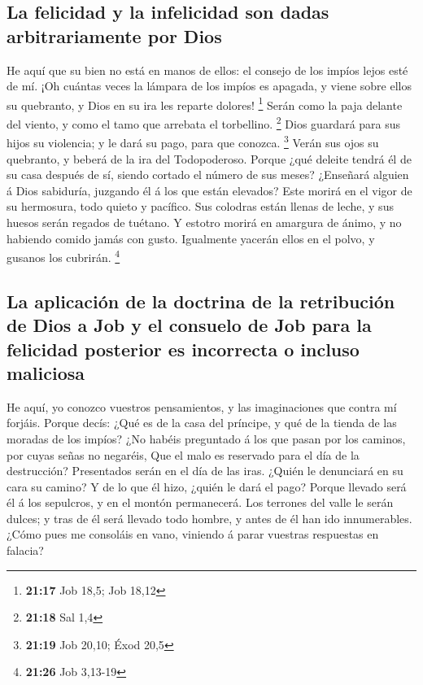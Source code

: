 \hypertarget{la-felicidad-y-la-infelicidad-son-dadas-arbitrariamente-por-dios}{%
\subsection{La felicidad y la infelicidad son dadas arbitrariamente por
Dios}\label{la-felicidad-y-la-infelicidad-son-dadas-arbitrariamente-por-dios}}

 He aquí que su bien no está en manos de ellos: el consejo
de los impíos lejos esté de mí.  ¡Oh cuántas veces la
lámpara de los impíos es apagada, y viene sobre ellos su quebranto, y
Dios en su ira les reparte dolores! \footnote{\textbf{21:17} Job 18,5;
  Job 18,12}  Serán como la paja delante del viento, y como
el tamo que arrebata el torbellino. \footnote{\textbf{21:18} Sal 1,4}
 Dios guardará para sus hijos su violencia; y le dará su
pago, para que conozca. \footnote{\textbf{21:19} Job 20,10; Éxod 20,5}
 Verán sus ojos su quebranto, y beberá de la ira del
Todopoderoso.  Porque ¿qué deleite tendrá él de su casa
después de sí, siendo cortado el número de sus meses? 
¿Enseñará alguien á Dios sabiduría, juzgando él á los que están
elevados?  Este morirá en el vigor de su hermosura, todo
quieto y pacífico.  Sus colodras están llenas de leche, y
sus huesos serán regados de tuétano.  Y estotro morirá en
amargura de ánimo, y no habiendo comido jamás con gusto. 
Igualmente yacerán ellos en el polvo, y gusanos los cubrirán.
\footnote{\textbf{21:26} Job 3,13-19}

\hypertarget{la-aplicaciuxf3n-de-la-doctrina-de-la-retribuciuxf3n-de-dios-a-job-y-el-consuelo-de-job-para-la-felicidad-posterior-es-incorrecta-o-incluso-maliciosa}{%
\subsection{La aplicación de la doctrina de la retribución de Dios a Job
y el consuelo de Job para la felicidad posterior es incorrecta o incluso
maliciosa}\label{la-aplicaciuxf3n-de-la-doctrina-de-la-retribuciuxf3n-de-dios-a-job-y-el-consuelo-de-job-para-la-felicidad-posterior-es-incorrecta-o-incluso-maliciosa}}

 He aquí, yo conozco vuestros pensamientos, y las
imaginaciones que contra mí forjáis.  Porque decís: ¿Qué es
de la casa del príncipe, y qué de la tienda de las moradas de los
impíos?  ¿No habéis preguntado á los que pasan por los
caminos, por cuyas señas no negaréis,  Que el malo es
reservado para el día de la destrucción? Presentados serán en el día de
las iras.  ¿Quién le denunciará en su cara su camino? Y de
lo que él hizo, ¿quién le dará el pago?  Porque llevado
será él á los sepulcros, y en el montón permanecerá.  Los
terrones del valle le serán dulces; y tras de él será llevado todo
hombre, y antes de él han ido innumerables.  ¿Cómo pues me
consoláis en vano, viniendo á parar vuestras respuestas en falacia?

